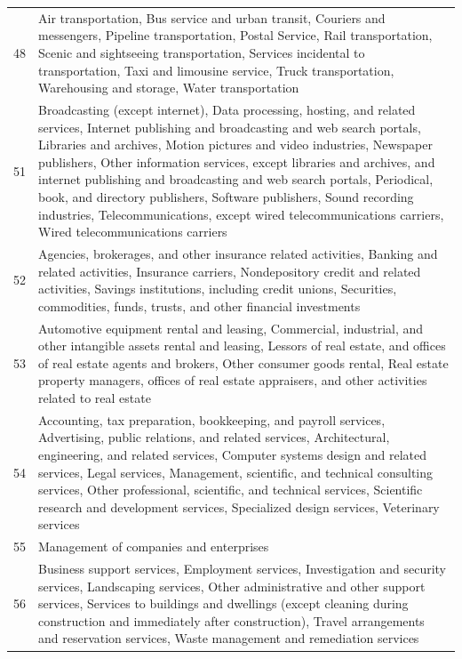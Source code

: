 \begin{longtable}{lp{18cm}}
  48 & Air transportation, Bus service and urban transit, Couriers and messengers, Pipeline transportation, Postal Service, Rail transportation, Scenic and sightseeing transportation, Services incidental to transportation, Taxi and limousine service, Truck transportation, Warehousing and storage, Water transportation \\ 
  51 & Broadcasting (except internet), Data processing, hosting, and related services, Internet publishing and broadcasting and web search portals, Libraries and archives, Motion pictures and video industries, Newspaper publishers, Other information services, except libraries and archives, and internet publishing and broadcasting and web search portals, Periodical, book, and directory publishers, Software publishers, Sound recording industries, Telecommunications, except wired telecommunications carriers, Wired telecommunications carriers \\ 
  52 & Agencies, brokerages, and other insurance related activities, Banking and related activities, Insurance carriers, Nondepository credit and related activities, Savings institutions, including credit unions, Securities, commodities, funds, trusts, and other financial investments \\ 
  53 & Automotive equipment rental and leasing, Commercial, industrial, and other intangible assets rental and leasing, Lessors of real estate, and offices of real estate agents and brokers, Other consumer goods rental, Real estate property managers, offices of real estate appraisers, and other activities related to real estate \\ 
  54 & Accounting, tax preparation, bookkeeping, and payroll services, Advertising, public relations, and related services, Architectural, engineering, and related services, Computer systems design and related services, Legal services, Management, scientific, and technical consulting services, Other professional, scientific, and technical services, Scientific research and development services, Specialized design services, Veterinary services \\ 
  55 & Management of companies and enterprises \\ 
  56 & Business support services, Employment services, Investigation and security services, Landscaping services, Other administrative and other support services, Services to buildings and dwellings (except cleaning during construction and immediately after construction), Travel arrangements and reservation services, Waste management and remediation services \\ 

\end{longtable}
